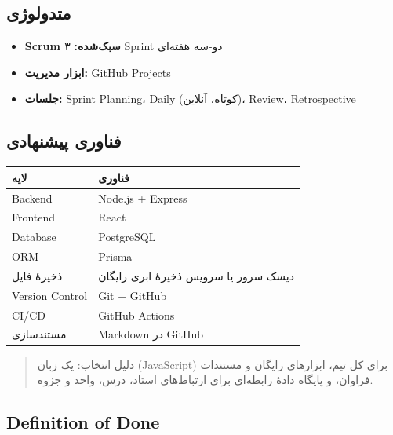 \documentclass[12pt, a4paper]{article}
\begin{document}
\subsection{متدولوژی}

\begin{itemize}
\tightlist
\item
  \textbf{Scrum سبک‌شده:} ۳ Sprint دو-سه هفته‌ای
\item
  \textbf{ابزار مدیریت:} GitHub Projects
\item
  \textbf{جلسات:} Sprint Planning، Daily (کوتاه، آنلاین)، Review، Retrospective
\end{itemize}

\subsection{فناوری پیشنهادی}

{\def\LTcaptype{none} %
\begin{longtable}[]{@{}
  >{\raggedright\arraybackslash}p{}
  >{\raggedright\arraybackslash}p{}@{}}
\toprule\noalign{}
\begin{minipage}[b]{\linewidth}\raggedright
لایه
\end{minipage} & \begin{minipage}[b]{\linewidth}\raggedright
فناوری
\end{minipage} \\
\midrule\noalign{}
\endhead
\bottomrule\noalign{}
\endlastfoot
Backend & Node.js + Express \\
Frontend & React \\
Database & PostgreSQL \\
ORM & Prisma \\
ذخیرهٔ فایل & دیسک سرور یا سرویس ذخیرهٔ ابری رایگان \\
Version Control & Git + GitHub \\
CI/CD & GitHub Actions \\
مستندسازی & Markdown در GitHub \\
\end{longtable}
}

\begin{quote}
دلیل انتخاب: یک زبان (JavaScript) برای کل تیم، ابزارهای رایگان و مستندات فراوان،
و پایگاه دادهٔ رابطه‌ای برای ارتباط‌های استاد، درس، واحد و جزوه.
\end{quote}

\subsection{Definition of Done}
\end{document}
